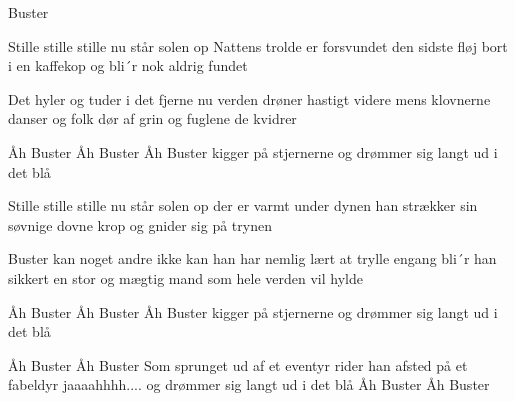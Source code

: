 \begin{sang}{Buster}{}
\begin{vers}
Stille stille stille nu står solen op
Nattens trolde er forsvundet
den sidste fløj bort i en kaffekop
og bli´r  nok aldrig fundet
\end{vers}
\begin{vers}
Det hyler og tuder i det fjerne nu
verden drøner hastigt videre
mens klovnerne danser og folk dør af grin
og fuglene de kvidrer
\end{vers}
\begin{omkvaed}
Åh Buster
Åh Buster
Åh Buster kigger på stjernerne
og drømmer sig langt ud i det blå
\end{omkvaed}
\begin{vers}
Stille stille stille nu står solen op
der er varmt under dynen
han strækker sin søvnige dovne krop
og gnider sig på trynen
\end{vers}
\vfill
\begin{vers}
Buster kan noget andre ikke kan
han har nemlig lært at trylle
engang bli´r han sikkert en stor og mægtig mand
som hele verden vil hylde
\end{vers}
\begin{omkvaed}
Åh Buster
Åh Buster
Åh Buster kigger på stjernerne
og drømmer sig langt ud i det blå
\end{omkvaed}
\begin{omkvaed}
Åh Buster
Åh Buster
Som sprunget ud af et eventyr
rider han afsted på et fabeldyr
jaaaahhhh....
og drømmer sig langt ud i det blå
Åh Buster
Åh Buster
\end{omkvaed}
\laps
\end{sang}
